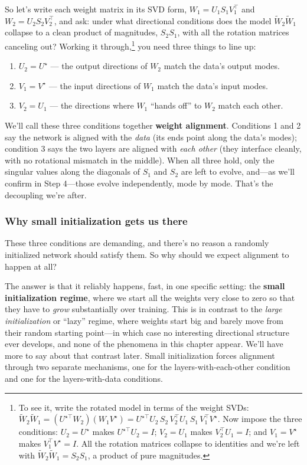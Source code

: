 So let's write each weight matrix in its SVD form, $W_1 = U_1 S_1 V_1^\top$ and
$W_2 = U_2 S_2 V_2^\top$, and ask: under what directional conditions does the
model $\tilde{W}_2 \tilde{W}_1$ collapse to a clean product of magnitudes,
$S_2 S_1$, with all the rotation matrices canceling out? Working it
through,\footnote{To see it, write the rotated model in terms of the weight SVDs:
$\tilde{W}_2 \tilde{W}_1 = (U^{\star\top} W_2)(W_1 V^\star) = U^{\star\top}U_2\,
S_2\, V_2^\top U_1\, S_1\, V_1^\top V^\star$. Now impose the three conditions:
$U_2 = U^\star$ makes $U^{\star\top}U_2 = I$; $V_2 = U_1$ makes $V_2^\top U_1 = I$;
and $V_1 = V^\star$ makes $V_1^\top V^\star = I$. All the rotation matrices
collapse to identities and we're left with $\tilde{W}_2 \tilde{W}_1 = S_2 S_1$, a
product of pure magnitudes.} you need three things to line up:
\begin{enumerate}
    \item $U_2 = U^\star$ --- the output directions of $W_2$ match the data's
    output modes.
    \item $V_1 = V^\star$ --- the input directions of $W_1$ match the data's input
    modes.
    \item $V_2 = U_1$ --- the directions where $W_1$ ``hands off'' to $W_2$ match
    each other.
\end{enumerate}

We'll call these three conditions together \textbf{weight alignment}. Conditions 1
and 2 say the network is aligned with the \emph{data} (its ends point along the
data's modes); condition 3 says the two layers are aligned with \emph{each other}
(they interface cleanly, with no rotational mismatch in the middle). When all
three hold, only the singular values along the diagonals of $S_1$ and $S_2$ are left to evolve, and---as we'll confirm in Step 4---those evolve independently, mode by mode. That's the
decoupling we're after.

\subsubsection*{Why small initialization gets us there}

These three conditions are demanding, and there's no reason a randomly initialized
network should satisfy them. So why should we expect alignment to happen at all?

The answer is that it reliably happens, fast, in one specific setting: the
\textbf{small initialization regime}, where we start all the weights very close to
zero so that they have to \emph{grow} substantially over training. This is in
contrast to the \emph{large initialization} or ``lazy'' regime, where weights
start big and barely move from their random starting point---in which case no
interesting directional structure ever develops, and none of the phenomena in
this chapter appear. We'll have more to say about that contrast later. Small
initialization forces alignment through two separate mechanisms, one for the
layers-with-each-other condition and one for the layers-with-data conditions.

